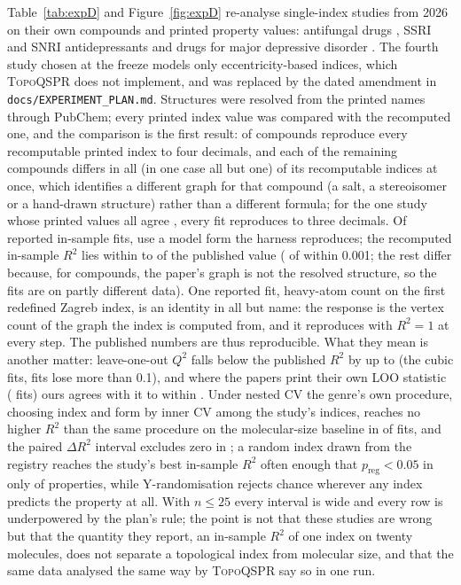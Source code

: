 \documentclass[preprint,12pt]{elsarticle}
\newcommand{\ml}{\textsc{TopoQSPR}}
\begin{document}
Table~\ref{tab:expD} and Figure~\ref{fig:expD} re-analyse \expDnStudies{} single-index studies from 2026 on their own compounds and printed property values: antifungal drugs \cite{almulla2026antifungal}, SSRI and SNRI antidepressants \cite{kabeer2026antidepressants} and drugs for major depressive disorder \cite{godlin2026mdd}. The fourth study chosen at the freeze \cite{vimala2026anticancer} models only eccentricity-based indices, which \ml{} does not implement, and was replaced by the dated amendment in \texttt{docs/EXPERIMENT\_PLAN.md}. Structures were resolved from the printed names through PubChem; every printed index value was compared with the recomputed one, and the comparison is the first result: \expDcompoundsAgree{} of \expDcompoundsChecked{} compounds reproduce every recomputable printed index to four decimals, and each of the remaining \expDnCompoundsAllIndicesDiffer{} compounds differs in all (in one case all but one) of its recomputable indices at once, which identifies a different graph for that compound (a salt, a stereoisomer or a hand-drawn structure) rather than a different formula; for the one study whose printed values all agree \cite{godlin2026mdd}, every fit reproduces to three decimals. Of \expDnFitsReported{} reported in-sample fits, \expDnFitsCompared{} use a model form the harness reproduces; the recomputed in-sample $R^2$ lies within \expDminDiff{} to \expDmaxDiff{} of the published value (\expDnExactFits{} of \expDnFitsCompared{} within 0.001; the rest differ because, for \expDnCompoundsAllIndicesDiffer{} compounds, the paper's graph is not the resolved structure, so the fits are on partly different data). One reported fit, heavy-atom count on the first redefined Zagreb index, is an identity in all but name: the response is the vertex count of the graph the index is computed from, and it reproduces with $R^2=1$ at every step. The published numbers are thus reproducible. What they mean is another matter: leave-one-out $Q^2$ falls below the published $R^2$ by up to \expDmaxLooDrop{} (the cubic fits, \expDnLooDropOverTenth{} fits lose more than 0.1), and where the papers print their own LOO statistic (\expDnLoocvCompared{} fits) ours agrees with it to within \expDmaxLooPublishedDiff. Under nested CV the genre's own procedure, choosing index and form by inner CV among the study's indices, reaches no higher $R^2$ than the same procedure on the molecular-size baseline in \expDnTIleSize{} of \expDnFitsCompared{} fits, and the paired $\Delta R^2$ interval excludes zero in \expDnDeltaSig{}; a random index drawn from the registry reaches the study's best in-sample $R^2$ often enough that $p_{\mathrm{reg}}<0.05$ in only \expDnRegistrySig{} of \expDnProperties{} properties, while Y-randomisation rejects chance wherever any index predicts the property at all. With $n\le25$ every interval is wide and every row is underpowered by the plan's rule; the point is not that these studies are wrong but that the quantity they report, an in-sample $R^2$ of one index on twenty molecules, does not separate a topological index from molecular size, and that the same data analysed the same way by \ml{} say so in one run.
\end{document}
